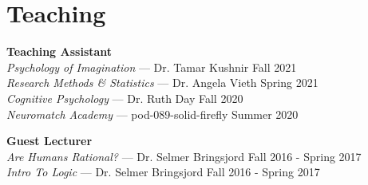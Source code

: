 \section{Teaching}
\textbf{Teaching Assistant} \\
\emph{Psychology of Imagination} --- Dr. Tamar Kushnir \hfill Fall 2021 \\
\emph{Research Methods \& Statistics} --- Dr. Angela Vieth \hfill Spring 2021 \\
\emph{Cognitive Psychology} --- Dr. Ruth Day \hfill Fall 2020 \\
\emph{Neuromatch Academy} --- pod-089-solid-firefly \hfill Summer 2020

\textbf{Guest Lecturer} \\
\emph{Are Humans Rational?} --- Dr. Selmer Bringsjord \hfill Fall 2016 - Spring 2017 \\
\emph{Intro To Logic} --- Dr. Selmer Bringsjord \hfill Fall 2016 - Spring 2017
